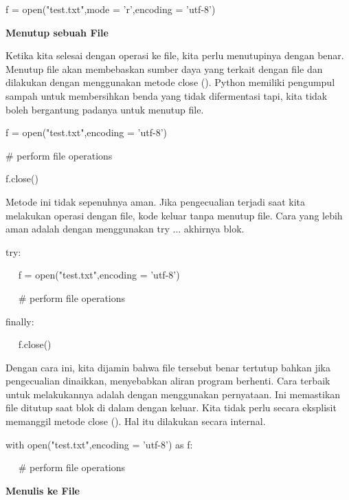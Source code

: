 \vspace{12pt}
\noindent 
f = open("test.txt",mode = 'r',encoding = 'utf-8') \par
\vspace{12pt}
\noindent 
{\fontsize{14pt}{14pt}\selectfont \textbf{Menutup sebuah File} \\} \par
Ketika kita selesai dengan operasi ke file, kita perlu menutupinya dengan benar. Menutup file akan membebaskan sumber daya yang terkait dengan file dan dilakukan dengan menggunakan metode close (). Python memiliki pengumpul sampah untuk membersihkan benda yang tidak difermentasi tapi, kita tidak boleh bergantung padanya untuk menutup file. \par
\noindent 
f = open("test.txt",encoding = 'utf-8') \par
\noindent 
 $  \#  $ perform file operations \par
\noindent 
f.close() \par
\vspace{12pt}
\noindent 
Metode ini tidak sepenuhnya aman. Jika pengecualian terjadi saat kita melakukan operasi dengan file, kode keluar tanpa menutup file. Cara yang lebih aman adalah dengan menggunakan try ... akhirnya blok. \par
\vspace{12pt}
\noindent 
try: \par
\noindent 
~~ f = open("test.txt",encoding = 'utf-8') \par
\noindent 
~~  $  \#  $ perform file operations \par
\noindent 
finally: \par
\noindent 
~~ f.close() \par
\vspace{12pt}
Dengan cara ini, kita dijamin bahwa file tersebut benar tertutup bahkan jika pengecualian dinaikkan, menyebabkan aliran program berhenti. Cara terbaik untuk melakukannya adalah dengan menggunakan pernyataan. Ini memastikan file ditutup saat blok di dalam dengan keluar. Kita tidak perlu secara eksplisit memanggil metode close (). Hal itu dilakukan secara internal. \par
\vspace{12pt}
\noindent 
with open("test.txt",encoding = 'utf-8') as f: \par
\noindent 
~~  $  \#  $ perform file operations \par
\vspace{12pt}
\noindent 
{\fontsize{14pt}{14pt}\selectfont \textbf{Menulis ke File} \\} \par
